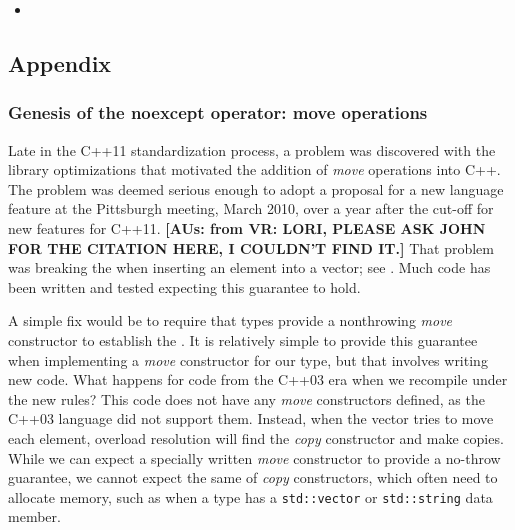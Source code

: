 \begin{itemize}
\item{\cite{krzemienski11}}
\end{itemize}

\subsection[Appendix]{Appendix}\label{appendix-noexceptoperator}

\subsubsection[Genesis of the \lstinline!noexcept! operator: move operations]{Genesis of the {\SubsubsecCode noexcept} operator: move operations}\label{genesis-of-the-noexcept-operator:-move-operations}

Late in the C++11 standardization process, a problem was discovered with
the library optimizations that motivated the addition of \emph{move}
operations into C++. The problem was deemed serious enough to adopt a
proposal for a new language feature at the Pittsburgh meeting, March
2010, over a year after the cut-off for new features for C++11. \textbf{[AUs: from VR: LORI, 
PLEASE ASK JOHN FOR THE CITATION HERE, I COULDN'T FIND IT.]} That problem
was breaking the  when
inserting an element into a vector; see . Much code has
been written and tested expecting this guarantee to hold.

A simple fix would be to require that types provide a nonthrowing
\emph{move} constructor to establish the . It is relatively simple to provide this guarantee when
implementing a \emph{move} constructor for our type, but that involves
writing new code. What happens for code from the C++03 era when we
recompile under the new rules? This code does not have any \emph{move}
constructors defined, as the C++03 language did not support them.
Instead, when the vector tries to move each element, overload resolution
will find the \emph{copy} constructor and make copies. While we can
expect a specially written \emph{move} constructor to provide a no-throw
guarantee, we cannot expect the same of \emph{copy} constructors, which
often need to allocate memory, such as when a type has a
\lstinline!std::vector! or \lstinline!std::string! data member.

